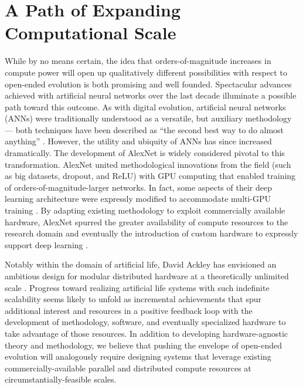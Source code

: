 \noindent{}

\section{A Path of Expanding Computational Scale}

While by no means certain, the idea that orders-of-magnitude increases in compute power will open up qualitatively different possibilities with respect to open-ended evolution is both promising and well founded.
Spectacular advances achieved with artificial neural networks over the last decade illuminate a possible path toward this outcome. As with digital evolution, artificial neural networks (ANNs) were traditionally understood as a versatile, but auxiliary methodology — both techniques have been described as ``the second best way to do almost anything'' \citep{miaoulis2008intelligent,eiben2015introduction}.
However, the utility and ubiquity of ANNs has since increased dramatically. The development of AlexNet is widely considered pivotal to this transformation. AlexNet united methodological innovations from the field (such as big datasets, dropout, and ReLU) with GPU computing that enabled training of orders-of-magnitude-larger networks.
In fact, some aspects of their deep learning architecture were expressly modified to accommodate multi-GPU training \citep{krizhevsky2012imagenet}.
By adapting existing methodology to exploit commercially available hardware, AlexNet spurred the greater availability of compute resources to the research domain and eventually the introduction of custom hardware to expressly support deep learning \citep{jouppi2017datacenter}.

Notably within the domain of artificial life, David Ackley has envisioned an ambitious design for modular distributed hardware at a theoretically unlimited scale \citep{ackley2011pursue}.
Progress toward realizing artificial life systems with such indefinite scalability seems likely to unfold as incremental achievements that spur additional interest and resources in a positive feedback loop with the development of methodology, software, and eventually specialized hardware to take advantage of those resources.
In addition to developing hardware-agnostic theory and methodology, we believe that pushing the envelope of open-ended evolution will analogously require designing systems that leverage existing commercially-available parallel and distributed compute resources at circumstantially-feasible scales.


